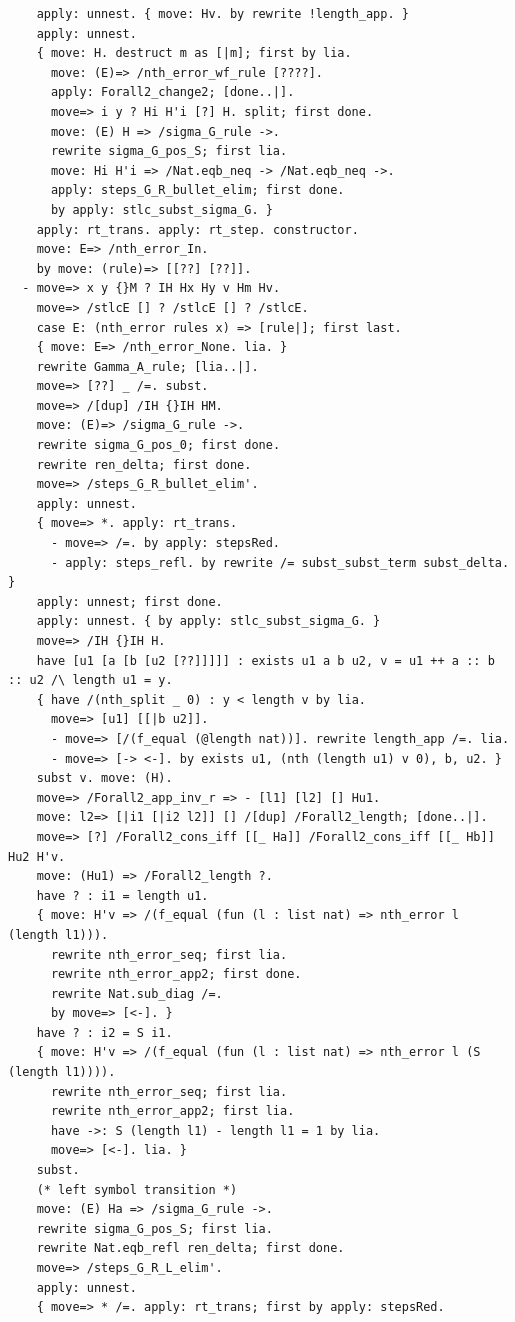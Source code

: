 \begin{lstlisting}
    apply: unnest. { move: Hv. by rewrite !length_app. }
    apply: unnest.
    { move: H. destruct m as [|m]; first by lia.
      move: (E)=> /nth_error_wf_rule [????].
      apply: Forall2_change2; [done..|].
      move=> i y ? Hi H'i [?] H. split; first done.
      move: (E) H => /sigma_G_rule ->.
      rewrite sigma_G_pos_S; first lia.
      move: Hi H'i => /Nat.eqb_neq -> /Nat.eqb_neq ->.
      apply: steps_G_R_bullet_elim; first done.
      by apply: stlc_subst_sigma_G. }
    apply: rt_trans. apply: rt_step. constructor.
    move: E=> /nth_error_In.
    by move: (rule)=> [[??] [??]].
  - move=> x y {}M ? IH Hx Hy v Hm Hv.
    move=> /stlcE [] ? /stlcE [] ? /stlcE.
    case E: (nth_error rules x) => [rule|]; first last.
    { move: E=> /nth_error_None. lia. }
    rewrite Gamma_A_rule; [lia..|].
    move=> [??] _ /=. subst.
    move=> /[dup] /IH {}IH HM.
    move: (E)=> /sigma_G_rule ->.
    rewrite sigma_G_pos_0; first done.
    rewrite ren_delta; first done.
    move=> /steps_G_R_bullet_elim'.
    apply: unnest.
    { move=> *. apply: rt_trans.
      - move=> /=. by apply: stepsRed.
      - apply: steps_refl. by rewrite /= subst_subst_term subst_delta. }
    apply: unnest; first done.
    apply: unnest. { by apply: stlc_subst_sigma_G. }
    move=> /IH {}IH H.
    have [u1 [a [b [u2 [??]]]]] : exists u1 a b u2, v = u1 ++ a :: b :: u2 /\ length u1 = y.
    { have /(nth_split _ 0) : y < length v by lia.
      move=> [u1] [[|b u2]].
      - move=> [/(f_equal (@length nat))]. rewrite length_app /=. lia.
      - move=> [-> <-]. by exists u1, (nth (length u1) v 0), b, u2. }
    subst v. move: (H). 
    move=> /Forall2_app_inv_r => - [l1] [l2] [] Hu1.
    move: l2=> [|i1 [|i2 l2]] [] /[dup] /Forall2_length; [done..|].
    move=> [?] /Forall2_cons_iff [[_ Ha]] /Forall2_cons_iff [[_ Hb]] Hu2 H'v.
    move: (Hu1) => /Forall2_length ?.
    have ? : i1 = length u1.
    { move: H'v => /(f_equal (fun (l : list nat) => nth_error l (length l1))).
      rewrite nth_error_seq; first lia.
      rewrite nth_error_app2; first done.
      rewrite Nat.sub_diag /=.
      by move=> [<-]. }
    have ? : i2 = S i1.
    { move: H'v => /(f_equal (fun (l : list nat) => nth_error l (S (length l1)))).
      rewrite nth_error_seq; first lia.
      rewrite nth_error_app2; first lia.
      have ->: S (length l1) - length l1 = 1 by lia.
      move=> [<-]. lia. }
    subst.
    (* left symbol transition *)
    move: (E) Ha => /sigma_G_rule ->.
    rewrite sigma_G_pos_S; first lia.
    rewrite Nat.eqb_refl ren_delta; first done.
    move=> /steps_G_R_L_elim'.
    apply: unnest.
    { move=> * /=. apply: rt_trans; first by apply: stepsRed.

\end{lstlisting}
